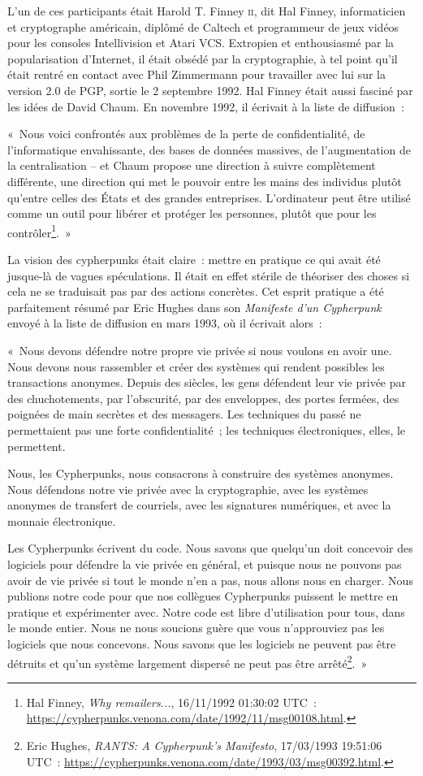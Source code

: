 \documentclass[
  a5paper,
  smalldemyvopaper,10pt,twoside,onecolumn,openright,extrafontsizes,hidelinks]{memoir}
\begin{document}
L'un de ces participants était Harold T. Finney \textsc{ii}, dit Hal
Finney, informaticien et cryptographe américain, diplômé de Caltech et
programmeur de jeux vidéos pour les consoles Intellivision et Atari VCS.
Extropien et enthousiasmé par la popularisation d'Internet, il était
obsédé par la cryptographie, à tel point qu'il était rentré en contact
avec Phil Zimmermann pour travailler avec lui sur la version 2.0 de PGP,
sortie le 2 septembre 1992. Hal Finney était aussi fasciné par les idées
de David Chaum. En novembre 1992, il écrivait à la liste de diffusion~:

«~Nous voici confrontés aux problèmes de la perte de confidentialité, de
l'informatique envahissante, des bases de données massives, de
l'augmentation de la centralisation -- et Chaum propose une direction à
suivre complètement différente, une direction qui met le pouvoir entre
les mains des individus plutôt qu'entre celles des États et des grandes
entreprises. L'ordinateur peut être utilisé comme un outil pour libérer
et protéger les personnes, plutôt que pour les contrôler\footnote{Hal
  Finney, \emph{Why remailers...}, 16/11/1992 01:30:02 UTC~:
  \url{https://cypherpunks.venona.com/date/1992/11/msg00108.html}.}.~»

La vision des cypherpunks était claire~: mettre en pratique ce qui avait
été jusque-là de vagues spéculations. Il était en effet stérile de
théoriser des choses si cela ne se traduisait pas par des actions
concrètes. Cet esprit pratique a été parfaitement résumé par Eric Hughes
dans son \emph{Manifeste d'un Cypherpunk} envoyé à la liste de diffusion
en mars 1993, où il écrivait alors~:

«~Nous devons défendre notre propre vie privée si nous voulons en avoir
une. Nous devons nous rassembler et créer des systèmes qui rendent
possibles les transactions anonymes. Depuis des siècles, les gens
défendent leur vie privée par des chuchotements, par l'obscurité, par
des enveloppes, des portes fermées, des poignées de main secrètes et des
messagers. Les techniques du passé ne permettaient pas une forte
confidentialité~; les techniques électroniques, elles, le permettent.

Nous, les Cypherpunks, nous consacrons à construire des systèmes
anonymes. Nous défendons notre vie privée avec la cryptographie, avec
les systèmes anonymes de transfert de courriels, avec les signatures
numériques, et avec la monnaie électronique.

Les Cypherpunks écrivent du code. Nous savons que quelqu'un doit
concevoir des logiciels pour défendre la vie privée en général, et
puisque nous ne pouvons pas avoir de vie privée si tout le monde n'en a
pas, nous allons nous en charger. Nous publions notre code pour que nos
collègues Cypherpunks puissent le mettre en pratique et expérimenter
avec. Notre code est libre d'utilisation pour tous, dans le monde
entier. Nous ne nous soucions guère que vous n'approuviez pas les
logiciels que nous concevons. Nous savons que les logiciels ne peuvent
pas être détruits et qu'un système largement dispersé ne peut pas être
arrêté\footnote{Eric Hughes, \emph{RANTS: A Cypherpunk's Manifesto},
  17/03/1993 19:51:06 UTC~:
  \url{https://cypherpunks.venona.com/date/1993/03/msg00392.html}.}.~»
\end{document}
